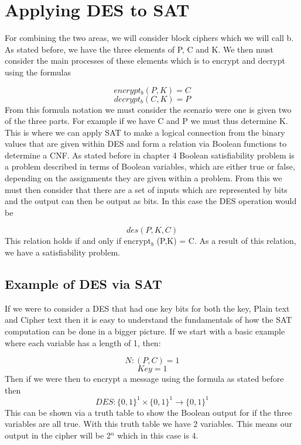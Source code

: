 \documentclass[11pt,a4paper]{report}
\begin{document}
\chapter{Applying DES to SAT}
\label{cha:AppDESSAT}

For combining the two areas, we will consider block ciphers which we will call b. As stated before, we have the three elements of P, C and K. We then must consider the main processes of these elements which is to encrypt and decrypt using the formulas 

\begin{displaymath}
encrypt_{b} (P,K) = C 
\end{displaymath}
\begin{displaymath}
decrypt_{b} (C, K) = P
\end{displaymath}
From this formula notation we must consider the scenario were one is given two of the three parts. For example if we have C and P we must thus determine K. This is where we can apply SAT to make a logical connection from the binary values that are given within DES and form a relation via Boolean functions to determine a CNF.
As stated before in chapter 4 Boolean satisfiability problem is a problem described in terms of Boolean variables, which are either true or false, depending on the assignments they are given within a problem. From this we must then consider that there are a set of inputs which are represented by bits and the output can then be output as bits. In this case the DES operation would be 

\begin{displaymath}
des(P,K,C)
\end{displaymath}
This relation holds if and only if encrypt$_{b}$ (P,K) = C. 
As a result of this relation, we have a satisfiability problem. 

\section{Example of DES via SAT }
If we were to consider a DES that had one key bits for both the key, Plain text and Cipher text then it is easy to understand the fundamentals of how the SAT computation can be done in a bigger picture. If we start with a basic example where each variable has a length of 1, then:

\begin{displaymath}
N: (P, C) = 1
\end{displaymath}
\begin{displaymath}
Key = 1
\end{displaymath}
Then if we were then to encrypt a message using the formula as stated before then
\begin{displaymath}
DES: \{0,1\}^{1} \times \{0,1\}^1 \rightarrow \{0,1\}^1
\end{displaymath}
This can be shown via a truth table to show the Boolean output for if the three variables are all true. With this truth table we have 2 variables. This means our output in the cipher will be 2$^{n}$ which in this case is 4. 
\end{document}
